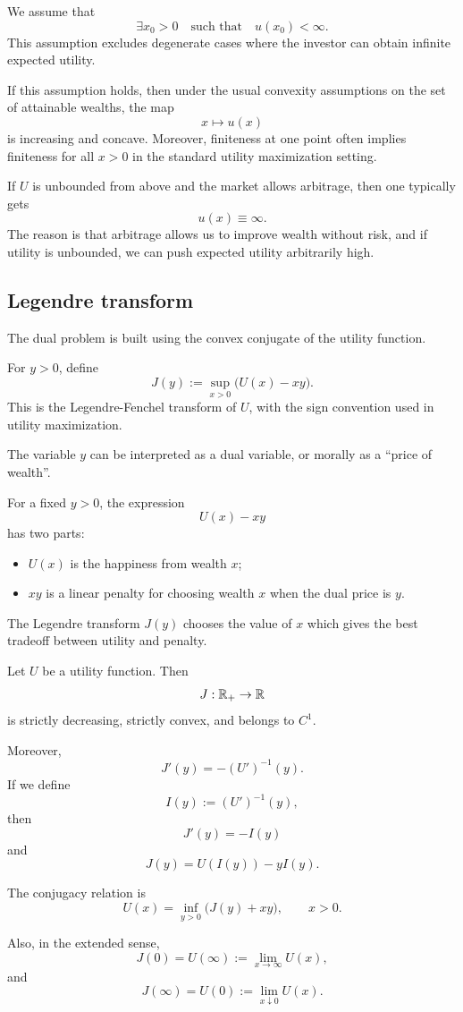 We assume that
\[
    \exists x_0>0
    \quad\text{such that}\quad
    u(x_0)<\infty.
\]
This assumption excludes degenerate cases where the investor can obtain infinite expected utility.

\begin{primer}
If this assumption holds, then under the usual convexity assumptions on the set of attainable wealths, the map
\[
    x\mapsto u(x)
\]
is increasing and concave. Moreover, finiteness at one point often implies finiteness for all $x>0$ in the standard utility maximization setting.
\end{primer}

\begin{primer}
If $U$ is unbounded from above and the market allows arbitrage, then one typically gets
\[
    u(x)\equiv \infty.
\]
The reason is that arbitrage allows us to improve wealth without risk, and if utility is unbounded, we can push expected utility arbitrarily high.
\end{primer}

\subsection{Legendre transform}

The dual problem is built using the convex conjugate of the utility function.

\begin{definicija}
For $y>0$, define
\[
    J(y)
    :=
    \sup_{x>0}
    \bigl(U(x)-xy\bigr).
\]
This is the Legendre-Fenchel transform of $U$, with the sign convention used in utility maximization.

The variable $y$ can be interpreted as a dual variable, or morally as a ``price of wealth''.
\end{definicija}

\begin{primer}
For a fixed $y>0$, the expression
\[
    U(x)-xy
\]
has two parts:
\begin{itemize}
    \item $U(x)$ is the happiness from wealth $x$;
    \item $xy$ is a linear penalty for choosing wealth $x$ when the dual price is $y$.
\end{itemize}
The Legendre transform $J(y)$ chooses the value of $x$ which gives the best tradeoff between utility and penalty.
\end{primer}

\begin{lema}
Let $U$ be a utility function. Then
\[
    J:\mathbb{R}_+\to\mathbb{R}
\]
is strictly decreasing, strictly convex, and belongs to $C^1$.

Moreover,
\[
    J'(y)=-(U')^{-1}(y).
\]
If we define
\[
    I(y):=(U')^{-1}(y),
\]
then
\[
    J'(y)=-I(y)
\]
and
\[
    J(y)=U(I(y))-yI(y).
\]

The conjugacy relation is
\[
    U(x)
    =
    \inf_{y>0}
    \bigl(J(y)+xy\bigr),
    \qquad x>0.
\]

Also, in the extended sense,
\[
    J(0)=U(\infty):=\lim_{x\to\infty}U(x),
\]
and
\[
    J(\infty)=U(0):=\lim_{x\downarrow 0}U(x).
\]
\end{lema}


